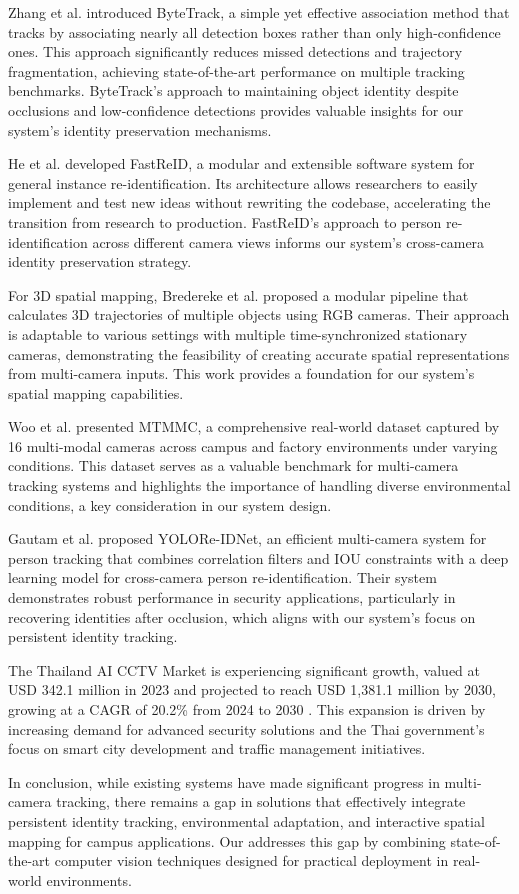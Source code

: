 Zhang et al. \cite{bytetrack} introduced ByteTrack, a simple yet effective association method that tracks by associating nearly all detection boxes rather than only high-confidence ones. This approach significantly reduces missed detections and trajectory fragmentation, achieving state-of-the-art performance on multiple tracking benchmarks. ByteTrack's approach to maintaining object identity despite occlusions and low-confidence detections provides valuable insights for our system's identity preservation mechanisms.

He et al. \cite{fastreid} developed FastReID, a modular and extensible software system for general instance re-identification. Its architecture allows researchers to easily implement and test new ideas without rewriting the codebase, accelerating the transition from research to production. FastReID's approach to person re-identification across different camera views informs our system's cross-camera identity preservation strategy.

For 3D spatial mapping, Bredereke et al. \cite{modular3d} proposed a modular pipeline that calculates 3D trajectories of multiple objects using RGB cameras. Their approach is adaptable to various settings with multiple time-synchronized stationary cameras, demonstrating the feasibility of creating accurate spatial representations from multi-camera inputs. This work provides a foundation for our system's spatial mapping capabilities.

Woo et al. \cite{mtmmc} presented MTMMC, a comprehensive real-world dataset captured by 16 multi-modal cameras across campus and factory environments under varying conditions. This dataset serves as a valuable benchmark for multi-camera tracking systems and highlights the importance of handling diverse environmental conditions, a key consideration in our system design.

Gautam et al. \cite{yoloreidnet} proposed YOLORe-IDNet, an efficient multi-camera system for person tracking that combines correlation filters and IOU constraints with a deep learning model for cross-camera person re-identification. Their system demonstrates robust performance in security applications, particularly in recovering identities after occlusion, which aligns with our system's focus on persistent identity tracking.

The Thailand AI CCTV Market is experiencing significant growth, valued at USD 342.1 million in 2023 and projected to reach USD 1,381.1 million by 2030, growing at a CAGR of 20.2\% from 2024 to 2030 \cite{thailand:market}. This expansion is driven by increasing demand for advanced security solutions and the Thai government's focus on smart city development and traffic management initiatives.

In conclusion, while existing systems have made significant progress in multi-camera tracking, there remains a gap in solutions that effectively integrate persistent identity tracking, environmental adaptation, and interactive spatial mapping for campus applications. Our \usevar{\srsTitle} addresses this gap by combining state-of-the-art computer vision techniques designed for practical deployment in real-world environments.